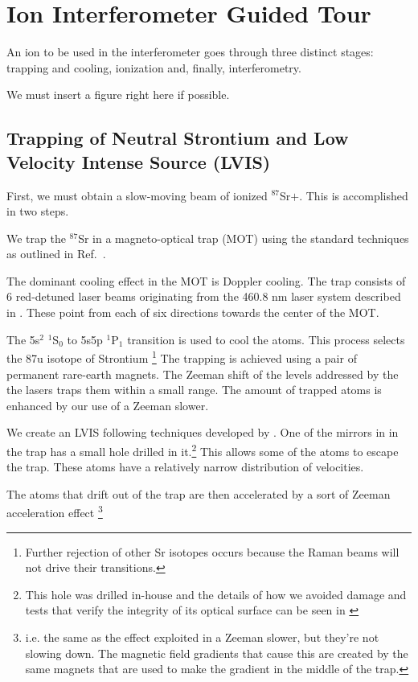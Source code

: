 \chapter{Ion Interferometer Guided Tour}
An ion to be used in the interferometer goes through three distinct stages: trapping and cooling, ionization and, finally, interferometry. 

We must insert a figure right here if possible. 

\section{Trapping of Neutral Strontium and Low Velocity Intense Source (LVIS)}

First, we must obtain a slow-moving beam of ionized $^{87}$Sr$+$. This is accomplished in two steps. 

We trap the $^{87}$Sr in a magneto-optical trap (MOT) using the standard techniques as outlined in Ref.\ \cite{cjeDiss}. 

The dominant cooling effect in the MOT is Doppler cooling. The trap consists of 6 red-detuned laser beams originating from the 460.8 nm laser system described in \cite{cjeDiss}. These point from each of six directions towards the center of the MOT. 

The 5s$^2$ $^1$S$_0$ to 5s5p $^1$P$_1$ transition is used to cool the atoms. This process selects the 87u isotope of Strontium \footnote{Further rejection of other Sr isotopes occurs because the Raman beams will not drive their transitions.}
The trapping is achieved using a pair of permanent rare-earth magnets. The Zeeman shift of the levels addressed by the the lasers traps them within a small range. The amount of trapped atoms is enhanced by our use of a Zeeman slower. 



We create an LVIS \cite{cjeDiss} following techniques developed by \cite{LVIS}. One of the mirrors in in the trap has a small hole drilled in it.\footnote{This hole was drilled in-house and the details of how we avoided damage and tests that verify the integrity of its optical surface can be seen in \cite{cjeDiss}} This allows some of the atoms to escape the trap. These atoms have a relatively narrow distribution of velocities. 

The atoms that drift out of the trap are then accelerated by a sort of Zeeman acceleration effect \footnote{i.e. the same as the effect exploited in a Zeeman slower, but they're not slowing down. The magnetic field gradients that cause this are created by the same magnets that are used to make the gradient in the middle of the trap.}


